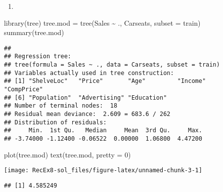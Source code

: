 \documentclass[
]{article}
\newenvironment{Shaded}{\begin{snugshade}}{\end{snugshade}}
\newcommand{\AttributeTok}[1]{\textcolor[rgb]{0.77,0.63,0.00}{#1}}
\newcommand{\DecValTok}[1]{\textcolor[rgb]{0.00,0.00,0.81}{#1}}
\newcommand{\FunctionTok}[1]{\textcolor[rgb]{0.00,0.00,0.00}{#1}}
\newcommand{\NormalTok}[1]{#1}
\newcommand{\OtherTok}[1]{\textcolor[rgb]{0.56,0.35,0.01}{#1}}
\newcommand{\SpecialCharTok}[1]{\textcolor[rgb]{0.00,0.00,0.00}{#1}}
\providecommand{\tightlist}{%
  \setlength{\itemsep}{0pt}\setlength{\parskip}{0pt}}
\begin{document}
\begin{enumerate}
\def\labelenumi{\alph{enumi})}
\setcounter{enumi}{1}
\tightlist
\item
\end{enumerate}

\begin{Shaded}
\begin{Highlighting}[]
\FunctionTok{library}\NormalTok{(tree)}
\NormalTok{tree.mod }\OtherTok{=} \FunctionTok{tree}\NormalTok{(Sales }\SpecialCharTok{\textasciitilde{}}\NormalTok{ ., Carseats, }\AttributeTok{subset =}\NormalTok{ train)}
\FunctionTok{summary}\NormalTok{(tree.mod)}
\end{Highlighting}
\end{Shaded}

\begin{verbatim}
## 
## Regression tree:
## tree(formula = Sales ~ ., data = Carseats, subset = train)
## Variables actually used in tree construction:
## [1] "ShelveLoc"   "Price"       "Age"         "Income"      "CompPrice"  
## [6] "Population"  "Advertising" "Education"  
## Number of terminal nodes:  18 
## Residual mean deviance:  2.609 = 683.6 / 262 
## Distribution of residuals:
##     Min.  1st Qu.   Median     Mean  3rd Qu.     Max. 
## -3.74000 -1.12400 -0.06522  0.00000  1.06800  4.47200
\end{verbatim}

\begin{Shaded}
\begin{Highlighting}[]
\FunctionTok{plot}\NormalTok{(tree.mod)}
\FunctionTok{text}\NormalTok{(tree.mod, }\AttributeTok{pretty =} \DecValTok{0}\NormalTok{)}
\end{Highlighting}
\end{Shaded}

\texttt{[image: RecEx8-sol\_files/figure-latex/unnamed-chunk-3-1]}

\begin{Shaded}
\end{Shaded}

\begin{verbatim}
## [1] 4.585249
\end{verbatim}
\end{document}
